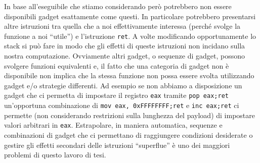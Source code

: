 In base all'eseguibile che stiamo considerando però potrebbero non
essere disponibili gadget esattamente come questi.  In particolare
potrebbero presentarsi altre istruzioni tra quella che a noi
effettivamente interessa (perché svolge la funzione a noi ``utile'') e
l'istruzione \lstinline{ret}. A volte modificando opportunamente lo
stack si può fare in modo che gli effetti di queste istruzioni non
incidano sulla nostra computazione. Ovviamente altri gadget, o
sequenze di gadget, possono svolgere funzioni equivalenti e, il fatto
che una categoria di gadget non è disponibile non implica che la
stessa funzione non possa essere svolta utilizzando gadget e/o
strategie differenti. Ad esempio se non abbiamo a disposizione un
gadget che ci permetta di impostare il registro \lstinline{eax}
tramite \lstinline{pop eax;ret} un'opportuna combinazione di
\lstinline{mov eax, 0xFFFFFFFF;ret} e \lstinline{inc eax;ret} ci
permette (non considerando restrizioni sulla lunghezza del payload) di
impostare valori arbitrari in \lstinline{eax}. Estrapolare, in maniera
automatica, sequenze e combinazioni di gadget che ci permettano di
raggiungere condizioni desiderate o gestire gli effetti secondari
delle istruzioni ``superflue'' è uno dei maggiori problemi di questo
lavoro di tesi.





